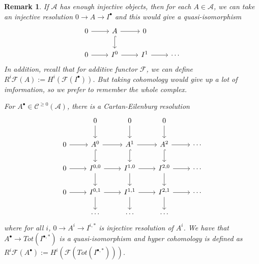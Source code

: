 \documentclass{ctexart}
\newtheorem{remark}{Remark}[section]
\begin{document}
\begin{remark}
    If $\mathscr{A}$ has enough injective objects, then for each $A\in \mathscr{A}$,
    we can take an injective resolution $0 \rightarrow A \rightarrow I^{\bullet}$ and this would give a quasi-isomorphism
    \begin{equation}
        \begin{tikzcd}
            0 \arrow[r] & 
            A \arrow[r] \arrow[d, hookrightarrow] &
            0 & \\
            0 \arrow[r] &
            I^{0} \arrow[r] &
            I^{1} \arrow[r] & 
            \cdots
        \end{tikzcd}
    \end{equation}
    In addition, recall that for additive functor $\mathcal{F}$, we can define $R^{i}\mathcal{F}(A) := H^{i}(\mathcal{F}(I^{\bullet}))$.
    But taking cohomology would give up a lot of imformation, so we prefer to remember the whole complex.
    \par
    For $A^{\bullet}\in \mathcal{C}^{\ge 0}(\mathscr{A})$, there is a Cartan-Eilenburg resolution
    \begin{equation}
        \begin{tikzcd}
            & 0 \arrow[d] &
            0 \arrow[d] &
            0 \arrow[d] & \\
            0 \arrow[r] & 
            A^{0} \arrow[r] \arrow[d, hookrightarrow] &
            A^{1} \arrow[r] \arrow[d, hookrightarrow] &
            A^{2} \arrow[r] \arrow[d, hookrightarrow] &
            \cdots \\
            0 \arrow[r] &
            I^{0,0} \arrow[r] \arrow[d] &
            I^{1,0} \arrow[r] \arrow[d] &
            I^{2,0} \arrow[r] \arrow[d] &
            \cdots \\
            0 \arrow[r] &
            I^{0,1} \arrow[r] \arrow[d] &
            I^{1,1} \arrow[r] \arrow[d] &
            I^{2,1} \arrow[r] \arrow[d] &
            \cdots \\
            & \cdots &
            \cdots &
            \cdots &
        \end{tikzcd}
    \end{equation}
    where for all $i$, $0 \rightarrow A^{i} \rightarrow I^{i, \ast}$ is injective resolution of $A^{i}$.
    We have that $A^{\bullet} \rightarrow Tot(I^{\bullet, \ast})$ is a quasi-isomorphism and hyper cohomology is defined as $R^{i}\mathcal{F}(A^{\bullet}) := H^{i}(\mathcal{F}(Tot(I^{\bullet, \ast})))$.
    \label{remark:derived_functor_when_there_are_enough_injective_objects}
\end{remark}
\end{document}
